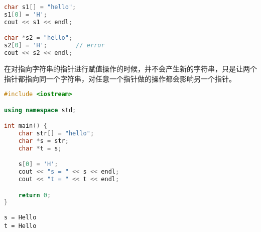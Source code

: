 \begin{lstlisting}[language=C++]
char s1[] = "hello";
s1[0] = 'H';
cout << s1 << endl;

char *s2 = "hello";
s2[0] = 'H';        // error
cout << s2 << endl;
\end{lstlisting}

在对指向字符串的指针进行赋值操作的时候，并不会产生新的字符串，只是让两个指针都指向同一个字符串，对任意一个指针做的操作都会影响另一个指针。\\

\begin{figure}[H]
    \centering
\end{figure}


\begin{lstlisting}[language=C++]
#include <iostream>

using namespace std;

int main() {
    char str[] = "hello";
    char *s = str;
    char *t = s;

    s[0] = 'H';
    cout << "s = " << s << endl;
    cout << "t = " << t << endl;

    return 0;
}
\end{lstlisting}

\begin{tcolorbox}
    \begin{verbatim}
s = Hello
t = Hello
	\end{verbatim}
\end{tcolorbox}

\newpage

